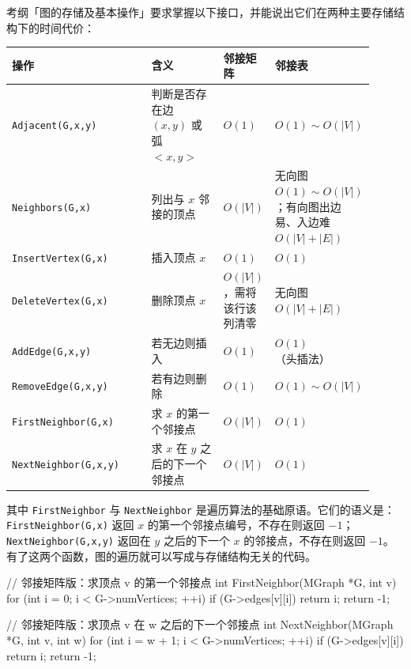 \documentclass[11pt,openany,UTF8]{ctexbook}
\begin{document}
考纲「图的存储及基本操作」要求掌握以下接口，并能说出它们在两种主要存储结构下的时间代价：

\begingroup\small\setlength{\tabcolsep}{4.0pt}
\begin{longtable}{@{}L{0.4392\linewidth}L{0.2344\linewidth}L{0.1189\linewidth}L{0.1189\linewidth}@{}}
\toprule
\textbf{操作} & \textbf{含义} & \textbf{邻接矩阵} & \textbf{邻接表} \\
\midrule
\endhead
\texttt{Adjacent(G,\allowbreak{}x,\allowbreak{}y)\allowbreak{}} & 判断是否存在边 $(x,y)$ 或弧 $<x,y>$ & $O(1)$ & $O(1)\sim O(\lvert V\rvert)$ \\
\texttt{Neighbors(G,\allowbreak{}x)\allowbreak{}} & 列出与 $x$ 邻接的顶点 & $O(\lvert V\rvert)$ & 无向图 $O(1)\sim O(\lvert V\rvert)$；有向图出边易、入边难 $O(\lvert V\rvert+\lvert E\rvert)$ \\
\texttt{InsertVertex(G,\allowbreak{}x)\allowbreak{}} & 插入顶点 $x$ & $O(1)$ & $O(1)$ \\
\texttt{DeleteVertex(G,\allowbreak{}x)\allowbreak{}} & 删除顶点 $x$ & $O(\lvert V\rvert)$，需将该行该列清零 & 无向图 $O(\lvert V\rvert+\lvert E\rvert)$ \\
\texttt{AddEdge(G,\allowbreak{}x,\allowbreak{}y)\allowbreak{}} & 若无边则插入 & $O(1)$ & $O(1)$（头插法） \\
\texttt{RemoveEdge(G,\allowbreak{}x,\allowbreak{}y)\allowbreak{}} & 若有边则删除 & $O(1)$ & $O(1)\sim O(\lvert V\rvert)$ \\
\texttt{FirstNeighbor(G,\allowbreak{}x)\allowbreak{}} & 求 $x$ 的第一个邻接点 & $O(\lvert V\rvert)$ & $O(1)$ \\
\texttt{NextNeighbor(G,\allowbreak{}x,\allowbreak{}y)\allowbreak{}} & 求 $x$ 在 $y$ 之后的下一个邻接点 & $O(\lvert V\rvert)$ & $O(1)$ \\
\bottomrule
\end{longtable}
\endgroup

其中 \texttt{FirstNeighbor} 与 \texttt{NextNeighbor} 是遍历算法的基础原语。它们的语义是：\texttt{FirstNeighbor(G,\allowbreak{}x)\allowbreak{}} 返回 $x$ 的第一个邻接点编号，不存在则返回 $-1$；\texttt{NextNeighbor(G,\allowbreak{}x,\allowbreak{}y)\allowbreak{}} 返回在 $y$ 之后的下一个 $x$ 的邻接点，不存在则返回 $-1$。有了这两个函数，图的遍历就可以写成与存储结构无关的代码。

\begin{codebox}
// 邻接矩阵版：求顶点 v 的第一个邻接点
int FirstNeighbor(MGraph *G, int v) {
    for (int i = 0; i < G->numVertices; ++i)
        if (G->edges[v][i]) return i;
    return -1;
}

// 邻接矩阵版：求顶点 v 在 w 之后的下一个邻接点
int NextNeighbor(MGraph *G, int v, int w) {
    for (int i = w + 1; i < G->numVertices; ++i)
        if (G->edges[v][i]) return i;
    return -1;
}
\end{codebox}
\end{document}
